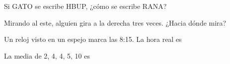 \begin{ejercicios}
\item Si GATO se escribe HBUP, ¿cómo se escribe RANA?
\item Mirando al este, alguien gira a la derecha tres veces. ¿Hacia dónde mira?
\item Un reloj visto en un espejo marca las 8:15. La hora real es
\item La media de 2, 4, 4, 5, 10 es
\end{ejercicios}
\makeatother
